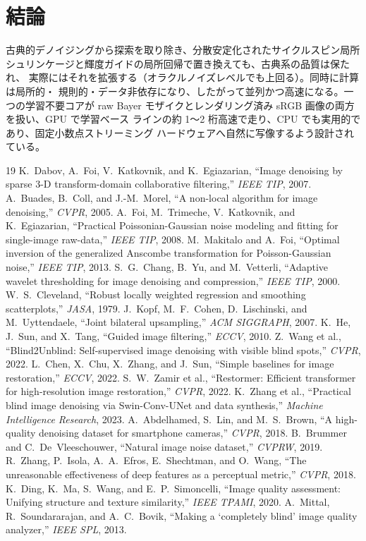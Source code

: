 \documentclass[10pt,twocolumn]{article}
\begin{document}
\section{結論}
古典的デノイジングから探索を取り除き、分散安定化されたサイクルスピン局所
シュリンケージと輝度ガイドの局所回帰で置き換えても、古典系の品質は保たれ、
実際にはそれを拡張する（オラクルノイズレベルでも上回る）。同時に計算は局所的・
規則的・データ非依存になり、したがって並列かつ高速になる。一つの学習不要コアが
raw Bayer モザイクとレンダリング済み sRGB 画像の両方を扱い、GPU で学習ベース
ラインの約 1〜2 桁高速で走り、CPU でも実用的であり、固定小数点ストリーミング
ハードウェアへ自然に写像するよう設計されている。

\begin{thebibliography}{19}\small
{} K.~Dabov, A.~Foi, V.~Katkovnik, and K.~Egiazarian, ``Image
denoising by sparse 3-D transform-domain collaborative filtering,'' \emph{IEEE
TIP}, 2007.
 A.~Buades, B.~Coll, and J.-M.~Morel, ``A non-local algorithm for
image denoising,'' \emph{CVPR}, 2005.
 A.~Foi, M.~Trimeche, V.~Katkovnik, and K.~Egiazarian,
``Practical Poissonian-Gaussian noise modeling and fitting for single-image
raw-data,'' \emph{IEEE TIP}, 2008.
 M.~Makitalo and A.~Foi, ``Optimal inversion of the
generalized Anscombe transformation for Poisson-Gaussian noise,'' \emph{IEEE
TIP}, 2013.
 S.~G.~Chang, B.~Yu, and M.~Vetterli, ``Adaptive wavelet
thresholding for image denoising and compression,'' \emph{IEEE TIP}, 2000.
 W.~S.~Cleveland, ``Robust locally weighted regression and
smoothing scatterplots,'' \emph{JASA}, 1979.
 J.~Kopf, M.~F.~Cohen, D.~Lischinski, and M.~Uyttendaele,
``Joint bilateral upsampling,'' \emph{ACM SIGGRAPH}, 2007.
 K.~He, J.~Sun, and X.~Tang, ``Guided image filtering,''
\emph{ECCV}, 2010.
 Z.~Wang et al., ``Blind2Unblind: Self-supervised image denoising
with visible blind spots,'' \emph{CVPR}, 2022.
 L.~Chen, X.~Chu, X.~Zhang, and J.~Sun, ``Simple baselines for
image restoration,'' \emph{ECCV}, 2022.
 S.~W.~Zamir et al., ``Restormer: Efficient transformer for
high-resolution image restoration,'' \emph{CVPR}, 2022.
 K.~Zhang et al., ``Practical blind image denoising via
Swin-Conv-UNet and data synthesis,'' \emph{Machine Intelligence Research},
2023.
 A.~Abdelhamed, S.~Lin, and M.~S.~Brown, ``A high-quality
denoising dataset for smartphone cameras,'' \emph{CVPR}, 2018.
 B.~Brummer and C.~De~Vleeschouwer, ``Natural image noise
dataset,'' \emph{CVPRW}, 2019.
 R.~Zhang, P.~Isola, A.~A.~Efros, E.~Shechtman, and O.~Wang,
``The unreasonable effectiveness of deep features as a perceptual metric,''
\emph{CVPR}, 2018.
 K.~Ding, K.~Ma, S.~Wang, and E.~P.~Simoncelli, ``Image quality
assessment: Unifying structure and texture similarity,'' \emph{IEEE TPAMI},
2020.
 A.~Mittal, R.~Soundararajan, and A.~C.~Bovik, ``Making a
`completely blind' image quality analyzer,'' \emph{IEEE SPL}, 2013.
\end{thebibliography}
\end{document}
